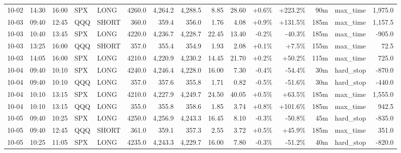 \documentclass[11pt,a4paper,twoside]{article}
\begin{document}
\begin{landscape}
\begin{center}
\begin{longtable}{>{\color{txtmain}}l l l l l r r r r r r r r >{\color{txtmain}}l r}
10-02 & 14:30 & 16:00 & SPX & LONG & 4260.0 & 4,264.2 & 4,288.5 & 8.85 & 28.60 & \textcolor{wingreen}{+0.6\%} & \textcolor{wingreen}{+223.2\%} & 90m & max\_time & \textcolor{wingreen}{1,975.0} \\
10-03 & 09:40 & 12:45 & QQQ & SHORT & 360.0 & 359.4 & 356.0 & 1.76 & 4.08 & \textcolor{wingreen}{+0.9\%} & \textcolor{wingreen}{+131.5\%} & 185m & max\_time & \textcolor{wingreen}{1,157.5} \\
10-03 & 10:40 & 13:45 & SPX & LONG & 4220.0 & 4,236.7 & 4,228.7 & 22.45 & 13.40 & \textcolor{lossred}{-0.2\%} & \textcolor{lossred}{-40.3\%} & 185m & max\_time & \textcolor{lossred}{-905.0} \\
10-03 & 13:25 & 16:00 & QQQ & SHORT & 357.0 & 355.4 & 354.9 & 1.93 & 2.08 & \textcolor{wingreen}{+0.1\%} & \textcolor{wingreen}{+7.5\%} & 155m & max\_time & \textcolor{wingreen}{72.5} \\
10-03 & 14:05 & 16:00 & SPX & LONG & 4210.0 & 4,220.9 & 4,230.2 & 14.45 & 21.70 & \textcolor{wingreen}{+0.2\%} & \textcolor{wingreen}{+50.2\%} & 115m & max\_time & \textcolor{wingreen}{725.0} \\
10-04 & 09:40 & 10:10 & SPX & LONG & 4240.0 & 4,246.4 & 4,228.0 & 16.00 & 7.30 & \textcolor{lossred}{-0.4\%} & \textcolor{lossred}{-54.4\%} & 30m & hard\_stop & \textcolor{lossred}{-870.0} \\
10-04 & 09:40 & 10:10 & QQQ & LONG & 357.0 & 357.6 & 355.8 & 1.71 & 0.82 & \textcolor{lossred}{-0.5\%} & \textcolor{lossred}{-51.6\%} & 30m & hard\_stop & \textcolor{lossred}{-440.0} \\
10-04 & 10:10 & 13:15 & SPX & LONG & 4210.0 & 4,227.9 & 4,249.7 & 24.50 & 40.05 & \textcolor{wingreen}{+0.5\%} & \textcolor{wingreen}{+63.5\%} & 185m & max\_time & \textcolor{wingreen}{1,555.0} \\
10-04 & 10:10 & 13:15 & QQQ & LONG & 355.0 & 355.8 & 358.6 & 1.85 & 3.74 & \textcolor{wingreen}{+0.8\%} & \textcolor{wingreen}{+101.6\%} & 185m & max\_time & \textcolor{wingreen}{942.5} \\
10-05 & 09:40 & 10:25 & SPX & LONG & 4250.0 & 4,256.9 & 4,243.3 & 16.45 & 8.10 & \textcolor{lossred}{-0.3\%} & \textcolor{lossred}{-50.8\%} & 45m & hard\_stop & \textcolor{lossred}{-835.0} \\
10-05 & 09:40 & 12:45 & QQQ & SHORT & 361.0 & 359.1 & 357.3 & 2.55 & 3.72 & \textcolor{wingreen}{+0.5\%} & \textcolor{wingreen}{+45.9\%} & 185m & max\_time & \textcolor{wingreen}{351.0} \\
10-05 & 10:25 & 11:05 & SPX & LONG & 4235.0 & 4,243.3 & 4,229.7 & 16.00 & 7.80 & \textcolor{lossred}{-0.3\%} & \textcolor{lossred}{-51.2\%} & 40m & hard\_stop & \textcolor{lossred}{-820.0} \\

\end{longtable}
\end{center}
\end{landscape}
\end{document}
